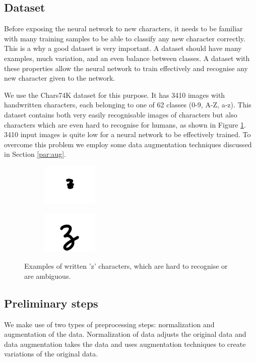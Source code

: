 \documentclass{article}
\begin{document}
\subsection{Dataset}
\label{sec:data}
Before exposing the neural network to new characters, it needs to be familiar with many training samples to be able to classify any new character correctly.
This is a why a good dataset is very important. A dataset should have many examples, much variation, and an even balance between classes. A dataset with these properties
allow the neural network to train effectively and recognise any new character given to the network.

We use the Chars74K dataset for this purpose. It has 3410 images with handwritten characters, each belonging to one of 62 classes (0-9, A-Z, a-z).
This dataset contains both very easily recognisable images of characters but also characters which are even hard to recognise for humans, as shown in Figure \ref{fig:char}.
3410 input images is quite low for a neural network to be effectively trained. To overcome this problem we employ some data augmentation techniques discussed in Section \ref{par:aug}.

\begin{figure}
\begin{subfigure}{.23\textwidth}
  \centering
  \includegraphics[height=2cm]{images/bad_char1}
\end{subfigure}
\begin{subfigure}{.23\textwidth}
  \centering
  \includegraphics[height=2cm]{images/bad_char2}
\end{subfigure}
\caption{Examples of written 'z' characters, which are hard to recognise or are ambiguous.}
\label{fig:char}
\end{figure}


\subsection{Preliminary steps}
\label{sec:preproc}
We make use of two types of preprocessing steps: normalization and augmentation of the data. Normalization of data adjusts the original data and data augmentation takes the data and uses augmentation techniques to create variations of the original data.
\end{document}
